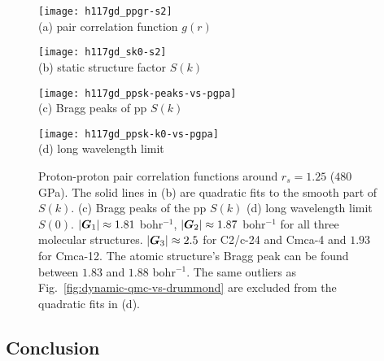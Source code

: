 \begin{figure}[h]
\centering
\begin{minipage}{0.49\textwidth}
\centering
\texttt{[image: h117gd\_ppgr-s2]}\\
(a) pair correlation function $g(r)$
\end{minipage}
\begin{minipage}{0.49\textwidth}
\centering
\texttt{[image: h117gd\_sk0-s2]}\\
(b) static structure factor $S(k)$
\end{minipage}
\centering
\begin{minipage}{0.49\textwidth}
\centering
\texttt{[image: h117gd\_ppsk-peaks-vs-pgpa]}\\
(c) Bragg peaks of pp $S(k)$
\end{minipage}
\begin{minipage}{0.49\textwidth}
\centering
\texttt{[image: h117gd\_ppsk-k0-vs-pgpa]}\\
(d) long wavelength limit
\end{minipage}
\caption{Proton-proton pair correlation functions around $r_s=1.25$ ($480$ GPa). The solid lines in (b) are quadratic fits to the smooth part of $S(k)$. (c) Bragg peaks of the pp $S(k)$ (d) long wavelength limit $S(0)$.  $\vert\boldsymbol{G}_1\vert\approx 1.81$ bohr$^{-1}$, $\vert\boldsymbol{G}_2\vert\approx 1.87$ bohr$^{-1}$ for all three molecular structures. $\vert\boldsymbol{G}_3\vert\approx 2.5$ for C2/c-24 and Cmca-4 and $1.93$ for Cmca-12. The atomic structure's Bragg peak can be found between $1.83$ and $1.88$ bohr$^{-1}$. The same outliers as Fig.~\ref{fig:dynamic-qmc-vs-drummond} are excluded from the quadratic fits in (d).}
\label{fig:hsolid-ppgrsk}
\end{figure}

\subsection{Conclusion}


